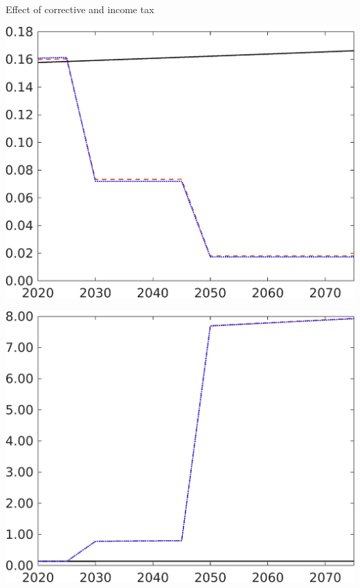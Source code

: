 \documentclass[11pt,aspectratio=169]{beamer}
\begin{document}
\begin{frame}{ Effect of corrective and income tax}
\begin{minipage}[]{0.3\textwidth}
	\end{minipage}
	\begin{minipage}[]{0.3\textwidth}
		\includegraphics[width=1\textwidth]{../codding_model/own_basedOnFried/optimalPol_elastS_DisuSci/figures/all_1705/CompCounterFac_withLF_taufopt1_taulopt0_F_spillover0_noskill0_sep1_BN0_ineq0_red0_xgrowth0_etaa0.79_lgd0.png}
	\end{minipage}
	\begin{minipage}[]{0.3\textwidth}
		\includegraphics[width=1\textwidth]{../codding_model/own_basedOnFried/optimalPol_elastS_DisuSci/figures/all_1705/CompCounterFac_withLF_taufopt1_taulopt0_GFF_spillover0_noskill0_sep1_BN0_ineq0_red0_xgrowth0_etaa0.79_lgd0.png}

\end{minipage}
\end{frame}
\end{document}
